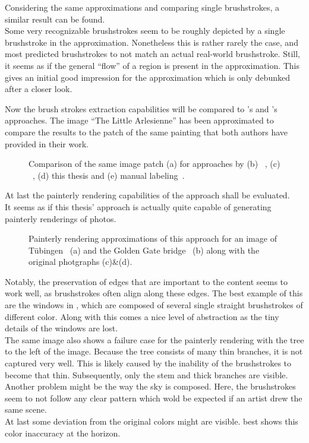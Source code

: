 Considering the same approximations and comparing single brushstrokes, a similar result can be found.\\
Some very recognizable brushstrokes seem to be roughly depicted by a single brushstroke in the approximation.
Nonetheless this is rather rarely the case, and most predicted brushstrokes to not match an actual real-world brushstroke.
Still, it seems as if the general ``flow'' of a region is present in the approximation.
This gives an initial good impression for the approximation which is only debunked after a closer look.

Now the brush strokes extraction capabilities will be compared to \citeauthor*{rhythmic}'s and \citeauthor*{lamberti}'s approaches.
The image ``The Little Arlesienne'' has been approximated to compare the results to the patch of the same painting that both authors have provided in their work.
\begin{figure*}
    \caption[]{Comparison of the same image patch (a) for approaches by (b) \citeauthor*{rhythmic}~\cite{rhythmic}, (c) \citeauthor*{lamberti}~\cite{lamberti}, (d) this thesis and (e) manual labeling~\cite{rhythmic}.}
\end{figure*}

At last the painterly rendering capabilities of the approach shall be evaluated.\\
It seems as if this thesis' approach is actually quite capable of generating painterly renderings of photos.
\begin{figure*}
    \caption[]{Painterly rendering approximations of this approach for an image of Tübingen~\cite{tub} (a) and the Golden Gate bridge~\cite{GGB} (b) along with the original photgraphs (c)\&(d).}
\end{figure*}
Notably, the preservation of edges that are important to the content seems to work well, as brushstrokes often align along these edges.
The best example of this are the windows in , which are composed of several single straight brushstrokes of different color.
Along with this comes a nice level of abstraction as the tiny details of the windows are lost.\\
The same image also shows a failure case for the painterly rendering with the tree to the left of the image.
Because the tree consists of many thin branches, it is not captured very well.
This is likely caused by the inability of the brushstrokes to become that thin.
Subsequently, only the stem and thick branches are visible.\\
Another problem might be the way the sky is composed.
Here, the brushstrokes seem to not follow any clear pattern which wold be expected if an artist drew the same scene.\\
At last some deviation from the original colors might are visible.
 best shows this color inaccuracy at the horizon.

